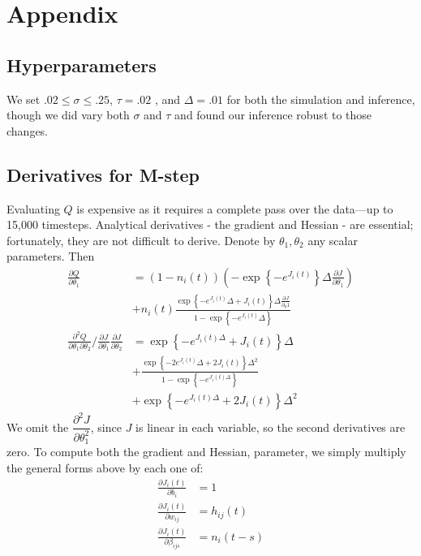 \documentclass{article}
\begin{document}
\begin{small}

 
\end{small}

\section{Appendix}
\subsection{Hyperparameters}
We set $.02 \leq \sigma \leq .25$, $\tau = .02$ \citep{gerstner2002}, and $\Delta = .01$ for both the simulation and inference, though we did vary both $\sigma$ and $\tau$ and found our inference robust to those changes.
\subsection{Derivatives for M-step}
Evaluating $Q$ is expensive as it requires a complete pass over the
data---up to 15,000 timesteps. Analytical derivatives - the gradient and Hessian - are essential;
fortunately, they are not difficult to derive. Denote by
$\theta_1, \theta_2$ any scalar parameters. Then
\begin{align*}
\frac{\partial Q}{\partial \theta_1} &= \left(1 - n_i(t)\right) \left(-\exp{\left\{-e^{J_i(t)}\right\}} \Delta \frac{\partial J}{\partial \theta_1}\right) \\
    &+ n_i(t) \frac{\exp{ \left\{ -e^{J_i(t)} \Delta + J_i(t) \right\}} \Delta \frac{\partial J}{\partial_\theta1} }{1 - \exp{\left\{-e^{J_i(t)}\Delta\right\}}} \\
\frac{\partial^2 Q}{\partial \theta_1 \partial \theta_2} / \frac{\partial J}{\partial \theta_1} \frac{\partial J}{\partial \theta_2} &= \exp{\left\{-e^{J_i(t)\Delta} + J_i(t)\right\}}\Delta \\
 &+ \frac{\exp{\left\{-2e^{J_i(t)}\Delta + 2J_i(t)\right\}}\Delta^2}{1 - \exp{\left\{-e^{J_i(t)\Delta}\right\}}} \\
 &+ \exp{\left\{-e^{J_i(t)\Delta} + 2J_i(t)\right\}} \Delta^2 
\end{align*}
We omit the $\dfrac{\partial^2 J}{\partial \theta_1^2}$, since $J$
is linear in each variable, so the second derivatives are zero. To
compute both the gradient and Hessian, parameter, we simply multiply
the general forms above by each one of:
\begin{align}
\frac{\partial J_i(t)}{\partial b_i}         &= 1 \\
\frac{\partial J_i(t)}{\partial w_{ij}}      &= h_{ij}(t) \\
\frac{\partial J_i(t)}{\partial \beta_{ijs}} &= n_i(t - s)
\end{align}
\end{document}
